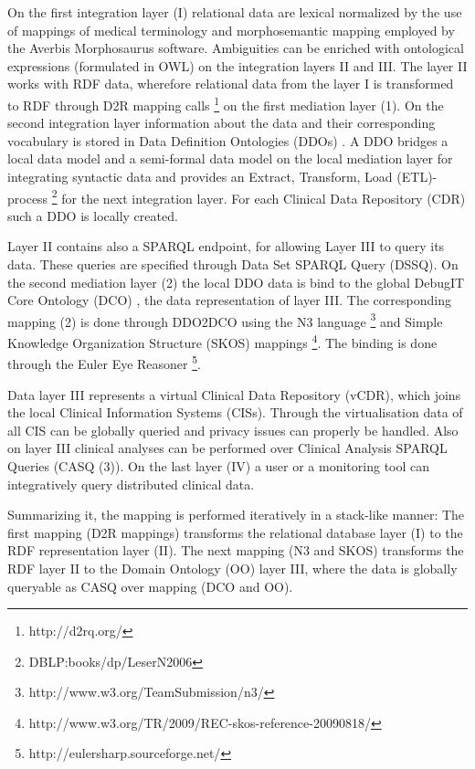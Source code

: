 On the first integration layer (I) relational data are lexical normalized by the use of mappings of medical terminology and morphosemantic mapping employed by the Averbis Morphosaurus software\cite{DaumkeDiss}. Ambiguities can be enriched with ontological expressions (formulated in OWL) on the integration layers II and III. The layer II works with RDF data, wherefore relational data from the layer I is transformed to RDF through D2R mapping calls \footnote{http://d2rq.org/} on the first mediation layer (1). On the second integration layer information about the data and their corresponding vocabulary is stored in Data Definition Ontologies (DDOs) \cite{DebugITDDO}. A DDO bridges a local data model and a semi-formal data model on the local mediation layer for integrating syntactic data and provides an Extract, Transform, Load (ETL)-process \footnote{DBLP:books/dp/LeserN2006} for the next integration layer. For each Clinical Data Repository (CDR) such a DDO is locally created. 

Layer II contains also a SPARQL endpoint, for allowing Layer III to query its data. These queries are specified through Data Set SPARQL Query (DSSQ). 
On the second mediation layer (2) the local DDO data is bind to the global DebugIT Core Ontology (DCO) \cite{Schober_developingdco:}, the data representation of layer III. The corresponding mapping (2) is done through DDO2DCO using the N3 language \footnote{http://www.w3.org/TeamSubmission/n3/} and Simple Knowledge Organization Structure (SKOS) mappings \footnote{http://www.w3.org/TR/2009/REC-skos-reference-20090818/}. The binding is done through the Euler Eye Reasoner \footnote{http://eulersharp.sourceforge.net/}.

Data layer III represents a virtual Clinical Data Repository (vCDR), which joins the local Clinical Information Systems (CISs). Through the virtualisation data of all CIS can be globally queried and privacy issues can properly be handled.
Also on layer III clinical analyses can be performed over Clinical Analysis SPARQL Queries (CASQ (3)). On the last layer (IV) a user or a monitoring tool can integratively query distributed clinical data.

Summarizing it, the mapping is performed iteratively in a stack-like manner:
The first mapping \textalpha (D2R mappings) transforms the relational database layer (I) to the RDF representation layer (II). The next mapping \textbeta (N3 and SKOS) transforms the RDF layer II to the Domain Ontology (OO) layer III, where the data is globally queryable as CASQ over mapping \textgamma (DCO and OO).  

